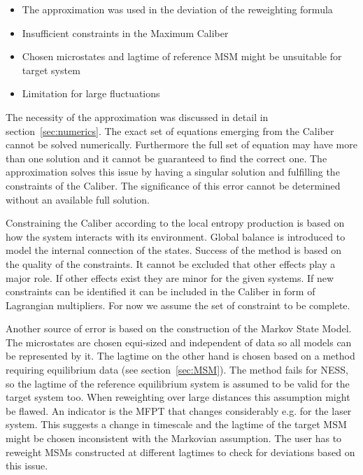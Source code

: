 \begin{itemize}
 \item The approximation was used in the deviation of the reweighting formula
 \item Insufficient constraints in the Maximum Caliber
 \item Chosen microstates and lagtime of reference MSM might be unsuitable for target system
 \item Limitation for large fluctuations
\end{itemize}

The necessity of the approximation was discussed in detail in section~\ref{sec:numerics}. The exact set of equations emerging from the Caliber cannot be solved numerically. Furthermore the full set of equation may have more than one solution and it cannot be guaranteed to find the correct one. The approximation solves this issue by having a singular solution and fulfilling the constraints of the Caliber. The significance of this error cannot be determined without an available full solution. 
 
Constraining the Caliber according to the local entropy production is based on how the system interacts with its environment. Global balance is introduced to model the internal connection of the states. Success of the method is based on the quality of the constraints. It cannot be excluded that other effects play a major role. If other effects exist they are minor for the given systems. If new constraints can be identified it can be included in the Caliber in form of Lagrangian multipliers. For now we assume the set of constraint to be complete.

Another source of error is based on the construction of the Markov State Model. The microstates are chosen equi-sized and independent of data so all models can be represented by it. The lagtime on the other hand is chosen based on a method  requiring equilibrium data (see section~\ref{sec:MSM}). The method fails for NESS, so the lagtime of the reference equilibrium system is assumed to be valid for the target system too. When reweighting over large distances this assumption might be flawed. An indicator is the MFPT that changes considerably e.g. for the laser system. This suggests a change in timescale and the lagtime of the target MSM might be chosen inconsistent with the Markovian assumption. The user has to reweight MSMs constructed at different lagtimes to check for deviations based on this issue. 

